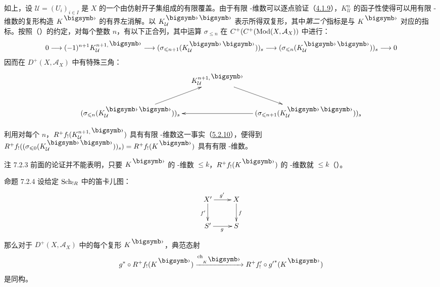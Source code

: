 如上，设 $\mathcal{U}=(U_{i})_{i\in I}$ 是 $X$ 的一个由仿射开子集组成的有限覆盖。由于有限 \tTor-维数可以逐点验证（\hyperref[XVII.def4.1.9]{4.1.9}），$K^{n}_{\mathcal{U}}$ 的函子性使得可以用有限 \tTor-维数的复形构造 $K^{\bigdot}$ 的有界左消解。以 $K^{\bigdot\bigdot}_{\mathcal{U}}$ 表示所得双复形，其中\emph{第二个}指标是与 $K^{\bigdot}$ 对应的指标。按照（）的约定，对每个整数 $n$，有以下正合列，其中运算 $\sigma_{\leq n}$ 在 $C^{+}(C^{+}(\operatorname{Mod}(X,\mathcal{A}_{X}))$ 中进行：
\[
\sisi{0\longrightarrow (\sigma_{\leq
n}(K^{\bigdot\bigdot}_{\mathcal{U}}))_{s}\longrightarrow (\sigma_{\leq
n+1}(K^{\bigdot\bigdot}_{\mathcal{U}}))_{s}\longrightarrow (-1)^{n+1}
K^{n+1,\bigdot}_{\mathcal{U}}\longrightarrow 0}{0\to (-1)^{n+1}K^{n+1,\bigdot}_{\mathcal{U}}\to(\sigma_{\leq
n+1}(K^{\bigdot\bigdot}_{\mathcal{U}}))_{s}\to(\sigma_{\leq
n}(K^{\bigdot\bigdot}_{\mathcal{U}}))_{s}\to 0}
\]
因而\pageoriginale 在 $D^{+}(X,\mathcal{A}_{X})$ 中有特殊三角：
\[
\xymatrix@C=1em{
  & K^{n+1,\bigdot}_{\Uu} \sisi{\ar[ld]}{\ar[rd]}&    \\
  (\sigma_{\leq n}(K^{\bigdot\bigdot}_{\Uu}))_s \sisi{\ar[rr]}{\ar[ur]}&  &(\sigma_{\leq
  n+1}(K^{\bigdot\bigdot}_{\Uu}))_s \sisi{\ar[lu]}{\ar[ll]}\\
}
\]

利用对每个 $n$，$R^{+}f_{!}(K^{n+1,\bigdot}_{\mathcal{U}})$ 具有有限 \tTor-维数这一事实（\hyperref[XVII.thm5.2.10]{5.2.10}），便得到 $R^{+}f_{!}((\sigma_{\leq
0}(K^{\bigdot\bigdot}_{\mathcal{U}}))_{s})=R^{+}f_{!}(K^{\bigdot})$ 具有有限 \tTor-维数。

\begin{enonce*}[remark]{注 7.2.3}
前面的论证并不能表明，只要 $K^{\bigdot}$ 的 \tTor-维数 $\leq k$，$R^{+}f_{!}(K^{\bigdot})$ 的 \tTor-维数就 $\leq k$（\cf {}）。
\end{enonce*}

\begin{enonce*}{命题 7.2.4}
设给定 $\operatorname{Sch}_{!R}$ 中的笛卡儿图：
\[
\xymatrix{
X'   \ar[r]^{g'}\ar[d]_{f'}& X \ar[d]^{f}\\
S'  \ar[r]_{g} & S
}
\]
那么对于 $D^{+}(X,\mathcal{A}_{X})$ 中的每个复形 $K^{\bigdot}$，典范态射
\[
g^{\ast}\circ
R^{+}f_{!}(K^{\bigdot})\xrightarrow{\mathrm{ch}_{K^{\bigdot}}}R^{+}f_{!}\sisi{}{'}\circ
{g'}^{\ast}(K^{\bigdot})
\]
是同构。
\end{enonce*}

